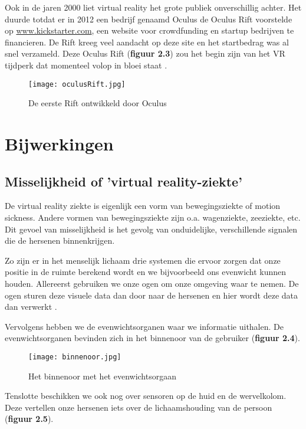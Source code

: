 Ook in de jaren 2000 liet virtual reality het grote publiek onverschillig achter. Het duurde totdat er in 2012 een bedrijf genaamd Oculus de Oculus Rift voorstelde op \href{https://www.kickstarter.com/}{www.kickstarter.com}, een website voor crowdfunding en startup bedrijven te financieren. De Rift kreeg veel aandacht op deze site en het startbedrag was al snel verzameld. Deze Oculus Rift (\textbf{figuur 2.3}) zou het begin zijn van het VR tijdperk dat momenteel volop in bloei staat \autocite{Society2019}.

\begin{figure}[h]
    \centering
    \texttt{[image: oculusRift.jpg]}
    \caption{De eerste Rift ontwikkeld door Oculus \autocite{Kumparak2014}}
\end{figure}

\section{Bijwerkingen}
\subsection{Misselijkheid of 'virtual reality-ziekte'}

De virtual reality ziekte is eigenlijk een vorm van bewegingsziekte of motion sickness. Andere vormen van bewegingsziekte zijn o.a. wagenziekte, zeeziekte, etc. Dit gevoel van misselijkheid is het gevolg van onduidelijke, verschillende signalen die de hersenen binnenkrijgen.

Zo zijn er in het menselijk lichaam drie systemen die ervoor zorgen dat onze positie in de ruimte berekend wordt en we bijvoorbeeld ons evenwicht kunnen houden.
Allereerst gebruiken we onze ogen om onze omgeving waar te nemen. De ogen sturen deze visuele data dan door naar de hersenen en hier wordt deze data dan verwerkt \autocite{Bovenij2019}.

Vervolgens hebben we de evenwichtsorganen waar we informatie uithalen. De evenwichtsorganen bevinden zich in het binnenoor van de gebruiker (\textbf{figuur 2.4}).

\begin{figure}[h]
    \centering
    \texttt{[image: binnenoor.jpg]}
    \caption{Het binnenoor met het evenwichtsorgaan \autocite{Utrecht2019}}
\end{figure}

Tenslotte beschikken we ook nog over sensoren op de huid en de wervelkolom. Deze vertellen onze hersenen iets over de lichaamshouding van de persoon (\textbf{figuur 2.5}).

